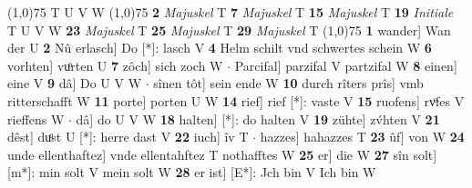\documentclass[8pt,a4paper,notitlepage]{article}
\begin{document}
\begin{table}[ht]
\begin{minipage}[t]{0.5\linewidth}
\begin{tabular}{rl}
\end{tabular}
\scriptsize
\line(1,0){75} \newline
T U V W \newline
\line(1,0){75} \newline
\textbf{2} \textit{Majuskel} T  \textbf{7} \textit{Majuskel} T  \textbf{15} \textit{Majuskel} T  \textbf{19} \textit{Initiale} T U V W  \textbf{23} \textit{Majuskel} T  \textbf{25} \textit{Majuskel} T  \textbf{29} \textit{Majuskel} T  \newline
\line(1,0){75} \newline
\textbf{1} wander] Wan der U \textbf{2} Nû erlasch] Do [*]: lasch V \textbf{4} Helm schilt vnd schwertes schein W \textbf{6} vorhten] vuͦrten U \textbf{7} zôch] sich zoch W  $\cdot$ Parcifal] parzifal V partzifal W \textbf{8} einen] eine V \textbf{9} dâ] Do U V W  $\cdot$ sînen tôt] sein ende W \textbf{10} durch rîters prîs] vmb ritterschafft W \textbf{11} porte] porten U W \textbf{14} rief] rief [*]: vaste V \textbf{15} ruofens] rvͦfes V rieffens W  $\cdot$ dâ] do U V W \textbf{18} halten] [*]: do halten V \textbf{19} zühte] zv́hten V \textbf{21} dêst] duͦst U [*]: herre dast V \textbf{22} iuch] îv T  $\cdot$ hazzes] hahazzes T \textbf{23} ûf] von W \textbf{24} unde ellenthaftez] vnde ellentahftez T nothafftes W \textbf{25} er] die W \textbf{27} sîn solt] [m*]: min solt V mein solt W \textbf{28} er ist] [E*]: Jch bin V Ich bin W \newline
\end{minipage}
\end{table}
\end{document}
